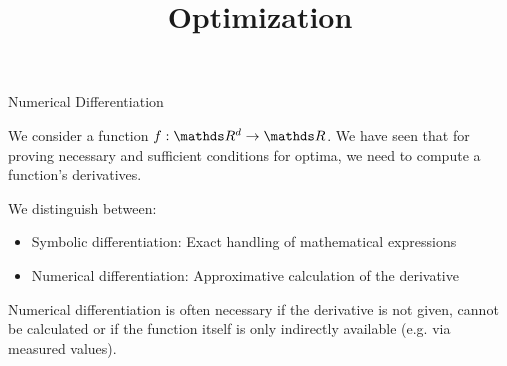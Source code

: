 \documentclass[11pt,compress,t,notes=noshow, xcolor=table]{beamer}
\title{Optimization}
\date{}
\begin{document}
\sloppy

\begin{vbframe}{Numerical Differentiation}   

  We consider a function $f: \R^d \rightarrow \R$. We have seen that for proving necessary and sufficient conditions for optima, we need to compute a function's derivatives. 
  
  \lz 
  
  We distinguish between: 
  
  \begin{itemize}
  \item Symbolic differentiation: Exact handling of mathematical expressions
  \item Numerical differentiation: Approximative calculation of the derivative
  \end{itemize}
  
  Numerical differentiation is often necessary if the derivative is not given, cannot be calculated or if the function itself is only indirectly available (e.g. via measured values).
  
  \end{vbframe}
  
\end{document}
